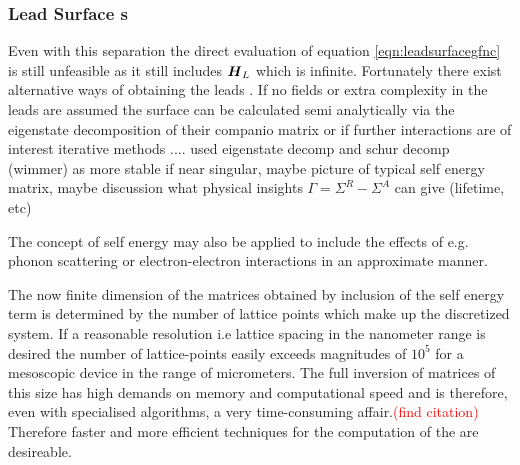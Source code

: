 \subsubsection{Lead Surface \cgfnc s}
Even with this separation the direct evaluation of equation \ref{eqn:leadsurfacegfnc} is still unfeasible as it still includes $\boldsymbol{H}_L$ which is infinite. Fortunately there exist alternative ways of obtaining the leads \gfnc{}.
If no fields or extra complexity in the leads are assumed the surface \gfnc{} can  be calculated semi analytically via the eigenstate decomposition of their companio matrix \cite{PhysRevB.55.5266} \cite{PhysRevB.66.205319} or if further interactions are of interest iterative methods ....
used eigenstate decomp and schur decomp (wimmer) as more stable if near singular, maybe picture of typical self energy matrix, maybe discussion what physical insights $\Gamma = \Sigma^R - \Sigma^A$ can give (lifetime, etc)

The concept of self energy may also be applied to include the effects of e.g. phonon scattering or electron-electron interactions in an approximate manner.

The now finite dimension of the matrices obtained by inclusion of the self energy term is determined by the number of lattice points which make up the discretized system.
If a reasonable resolution i.e lattice spacing in the nanometer range is desired the number of lattice-points easily exceeds magnitudes of $10^5$ for a mesoscopic device in the range of micrometers. 
The full inversion of matrices of this size has high demands on memory and computational speed and is therefore, even with specialised algorithms, a very time-consuming affair.\textcolor{red}{(find citation)}
Therefore faster and more efficient techniques for the computation of the \gfnc{} are desireable.
